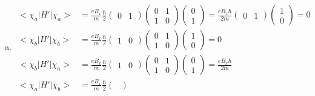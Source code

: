 \documentclass[12 pt]{article}
\numberwithin{equation}{section}
\begin{document}
\begin{enumerate}[a)]
  \item 
    
    \begin{align}
      \big<\chi_a\big|H'\big|\chi_a\big>&= \frac{eB_x}{m}\frac{\hbar}{2}\begin{pmatrix} 
        0 & 1 \end{pmatrix}
        \begin{pmatrix}
        0 & 1\\
        1 & 0
        \end{pmatrix}
        \begin{pmatrix} 
        0\\
        1
        \end{pmatrix}
       = \frac{eB_x\hbar}{2m}
      \begin{pmatrix}
        0 & 1
      \end{pmatrix}
      \begin{pmatrix}
        1\\
        0
      \end{pmatrix} = 0\\
\big<\chi_b\big|H'\big|\chi_b\big>&= \frac{eB_x}{m}\frac{\hbar}{2}\begin{pmatrix} 
        1 & 0 \end{pmatrix}
        \begin{pmatrix}
        0 & 1\\
        1 & 0
        \end{pmatrix}
        \begin{pmatrix} 
        1\\
        0
        \end{pmatrix}
       = 0\\
\big<\chi_b\big|H'\big|\chi_a\big>&= \frac{eB_x}{m}\frac{\hbar}{2}\begin{pmatrix} 
        1 & 0 \end{pmatrix}
        \begin{pmatrix}
        0 & 1\\
        1 & 0
        \end{pmatrix}
        \begin{pmatrix} 
        0\\
        1
        \end{pmatrix}
        = \frac{eB_x\hbar}{2m}\\
         \big<\chi_a\big|H'\big|\chi_b\big>&= \frac{eB_x}{m}\frac{\hbar}{2}\begin{pmatrix} 

\end{pmatrix}
\end{align}
\end{enumerate}
\end{document}
